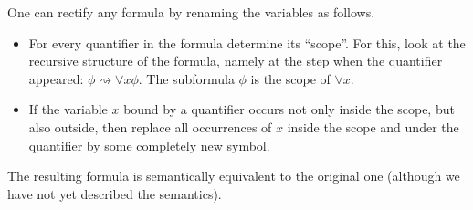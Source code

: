 
One can rectify any formula by renaming the variables as follows.
\begin{itemize}
\item
For every quantifier in the formula determine its ``scope''.
For this, look at the recursive structure of the formula,
namely at the step when the quantifier appeared: $\phi \rightsquigarrow \forall x \phi$.
The subformula $\phi$ is the scope of $\forall x$.
\item
If the variable $x$ bound by a quantifier occurs not only inside the scope,
but also outside, then replace all occurrences of $x$ inside the scope and under the quantifier by some completely new symbol.
\end{itemize}

The resulting formula is semantically equivalent to the original one (although we have not yet described the semantics).
